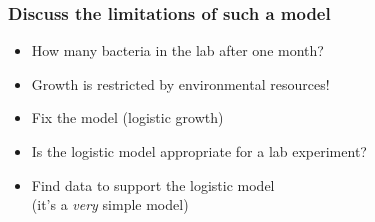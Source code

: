 \documentclass{beamer}
\begin{document}
\begin{frame}
\frametitle{Discuss the limitations of such a model}

\begin{block}{}
\begin{itemize}
 \item How many bacteria in the lab after one month?

 \item Growth is restricted by environmental resources!

 \item Fix the model (logistic growth)

 \item Is the logistic model appropriate for a lab experiment?

 \item Find data to support the logistic model \\
   (it's a \emph{very} simple model)
\end{itemize}

\noindent
\end{block}
\end{frame}
\end{document}
